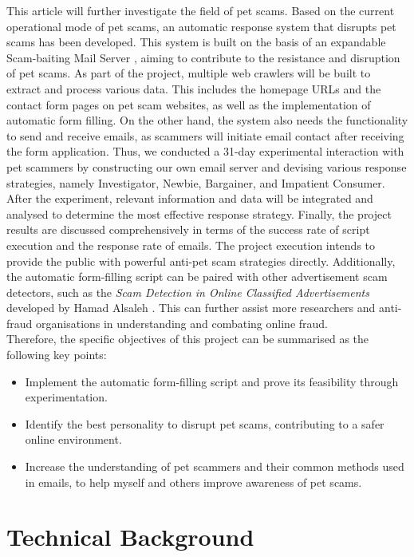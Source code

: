 \documentclass[ oneside,%
                    author={Cassie Qing Tang},
                    degree={BSc},
                     title={An Automated Response System for Disrupting Online Pet Scamming \\ },
                    subtitle={ }]{dissertation}
\begin{document}
This article will further investigate the field of pet scams. Based on the current operational mode of pet scams, an automatic response system that disrupts pet scams has been developed. This system is built on the basis of an expandable Scam-baiting Mail Server \cite{an19352_an19352scambaiter_back_2023}, aiming to contribute to the resistance and disruption of pet scams. As part of the project, multiple web crawlers will be built to extract and process various data. This includes the homepage URLs and the contact form pages on pet scam websites, as well as the implementation of automatic form filling. On the other hand, the system also needs the functionality to send and receive emails, as scammers will initiate email contact after receiving the form application. Thus, we conducted a 31-day experimental interaction with pet scammers by constructing our own email server and devising various response strategies, namely Investigator, Newbie, Bargainer, and Impatient Consumer. After the experiment, relevant information and data will be integrated and analysed to determine the most effective response strategy. Finally, the project results are discussed comprehensively in terms of the success rate of script execution and the response rate of emails. The project execution intends to provide the public with powerful anti-pet scam strategies directly. Additionally, the automatic form-filling script can be paired with other advertisement scam detectors, such as the \textit{Scam Detection in Online Classified Advertisements} developed by Hamad Alsaleh \cite{alsaleh_scam_2017}. This can further assist more researchers and anti-fraud organisations in understanding and combating online fraud.
\\

Therefore, the specific objectives of this project can be summarised as the following key points:

\begin{itemize}
  \item Implement the automatic form-filling script and prove its feasibility through experimentation.
  \item Identify the best personality to disrupt pet scams, contributing to a safer online environment.
  \item Increase the understanding of pet scammers and their common methods used in emails, to help myself and others improve awareness of pet scams.
\end{itemize}


\chapter{Technical Background}
\end{document}
